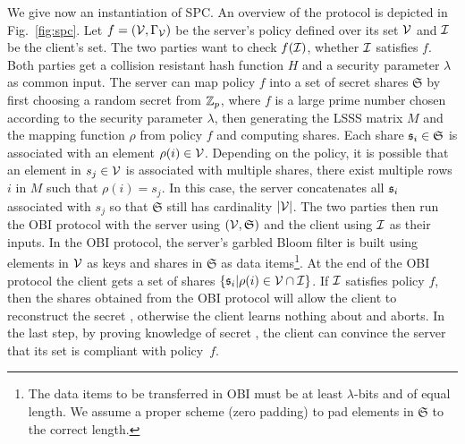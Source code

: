\noindent
We give now an instantiation of \ac{SPC}.
An overview of the protocol is depicted in Fig.~\ref{fig:spc}. 
Let $f=(\mathcal{V},\Gamma_\mathcal{V})$ be the server's policy defined over its set $\mathcal{V}$ and $\mathcal{I}$ be the client's set. 
The two parties want to check $f(\mathcal{I})$, \ie whether $\mathcal{I}$ satisfies $f$. 
Both parties get a collision resistant hash function $H$ and a security parameter $\lambda$ as common input. 
The server can map policy $f$ into a set of secret shares $\mathfrak{S}$ by first choosing a random secret \secret from $\mathbb{Z}_p$, where $f$ is a large prime number chosen according to the security parameter $\lambda$, then generating the \ac{LSSS} matrix $M$ and the mapping function $\rho$ from policy $f$ and computing shares. 
Each share $\mathfrak{s}_i \in \mathfrak{S}$ is associated with an element $\rho(i)\in \mathcal{V}$. 
Depending on the policy, it is possible that an element in $s_j\in\mathcal{V}$ is associated with multiple shares, \ie there exist multiple rows $i$ in $M$ such that $\rho(i)=s_j$. 
In this case, the server concatenates all $\mathfrak{s}_i$ associated with $s_j$ so that $\mathfrak{S}$ still has cardinality $|\mathcal{V}|$. 
The two parties then run the \ac{OBI} protocol with the server using $(\mathcal{V}, \mathfrak{S})$ and the client using $\mathcal{I}$ as their inputs. 
In the \ac{OBI} protocol, the server's garbled Bloom filter is built using elements in $\mathcal{V}$ as keys and shares in $\mathfrak{S}$ as data items\footnote{The data items to be transferred in \ac{OBI} must be at least $\lambda$-bits and of equal length. 
We assume a proper scheme (\eg zero padding) to pad elements in $\mathfrak{S}$ to the correct length.}.
At the end of the \ac{OBI} protocol the client gets a set of shares $\{\mathfrak{s}_i|\rho(i)\in \mathcal{V}\cap \mathcal{I}\}$. 
If $\mathcal{I}$ satisfies policy $f$, then the shares obtained from the \ac{OBI} protocol will allow the client to reconstruct the secret \secret, otherwise the client learns nothing about \secret and aborts. 
In the last step, by proving knowledge of secret \secret, the client can convince the server that its set is compliant with policy~$f$.



